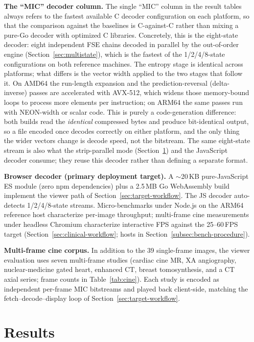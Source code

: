 \documentclass[journal]{IEEEtran}
\begin{document}
\textbf{The ``MIC'' decoder column.} The single ``MIC'' column in the result
tables always refers to the fastest available C decoder configuration on each
platform, so that the comparison against the baselines is C-against-C rather
than mixing a pure-Go decoder with optimized C libraries. Concretely, this is
the eight-state decoder: eight independent FSE chains decoded in parallel by the
out-of-order engine (Section~\ref{sec:multistate}), which is the fastest of the
1/2/4/8-state configurations on both reference machines. The entropy stage is
identical across platforms; what differs is the vector width applied to the two
stages that follow it. On AMD64 the run-length expansion and the
prediction-reversal (delta-inverse) passes are accelerated with AVX-512, which
widens those memory-bound loops to process more elements per instruction; on
ARM64 the same passes run with NEON-width or scalar code. This is purely a
code-generation difference: both builds read the \emph{identical} compressed
bytes and produce bit-identical output, so a file encoded once decodes correctly
on either platform, and the only thing the wider vectors change is decode speed,
not the bitstream. The same eight-state stream is also what the strip-parallel
mode (Section~\ref{sec:results}) and the JavaScript decoder consume; they reuse
this decoder rather than defining a separate format.

\textbf{Browser decoder (primary deployment target).}
A ${\sim}$20\,KB pure-JavaScript ES module (zero npm dependencies) plus a
2.5\,MB Go WebAssembly build implement the viewer path of
Section~\ref{sec:target-workflow}. The JS decoder auto-detects 1/2/4/8-state
streams. Micro-benchmarks under Node.js on the ARM64 reference host
characterize per-image throughput; multi-frame cine measurements under headless
Chromium characterize interactive FPS against the 25--60\,FPS target
(Section~\ref{sec:clinical-workflow}; hosts in
Section~\ref{subsec:bench-procedure}).

\textbf{Multi-frame cine corpus.} In addition to the 39 single-frame images, the
viewer evaluation uses seven multi-frame studies (cardiac cine MR, XA
angiography, nuclear-medicine gated heart, enhanced CT, breast tomosynthesis,
and a CT axial series; frame counts in Table~\ref{tab:cine}). Each study is
encoded as independent per-frame MIC bitstreams and played back client-side,
matching the fetch--decode--display loop of Section~\ref{sec:target-workflow}.

\section{Results}
\label{sec:results}
\end{document}
